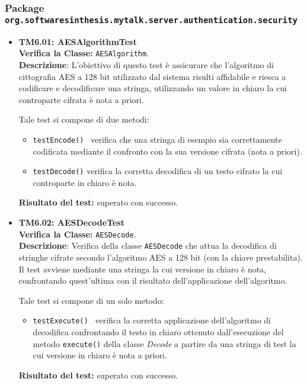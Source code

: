 \subsubsection{Package \texttt{org.softwaresinthesis.mytalk.server.authentication.security}}
\begin{itemize}

\item \textbf{TM6.01: AESAlgorithmTest}\\
\textbf{Verifica la Classe:} \texttt{AESAlgorithm}.\\
\textbf{Descrizione}: L'obiettivo di questo test è assicurare che l'algoritmo di cittografia AES a 128 bit utilizzato dal sistema \caName{} risulti affidabile e riesca a codificare e decodificare una stringa, utilizzando un valore in chiaro la cui controparte cifrata è nota a priori.

Tale test si compone di due metodi:
\begin{itemize}
\item \texttt{testEncode() } verifica che una stringa di esempio sia correttamente codificata mediante il confronto con la sua versione cifrata (nota a priori).

\item \texttt{testDecode()} verifica la corretta decodifica di un testo cifrato la cui controparte in chiaro è nota.
\end{itemize}
\textbf{Risultato del test:} superato con successo.


\item \textbf{TM6.02: AESDecodeTest}\\
\textbf{Verifica la Classe:} \texttt{AESDecode}.\\
\textbf{Descrizione}: Verifica della classe \texttt{AESDecode} che attua la decodifica di stringhe cifrate secondo l'algoritmo AES a 128 bit (con la chiave prestabilita). Il test avviene mediante una stringa la cui versione in chiaro è nota, confrontando quest'ultima con il risultato dell'applicazione dell'algoritmo.

Tale test si compone di un solo metodo:
\begin{itemize}
\item \texttt{testExecute() } verifica la corretta applicazione dell'algoritmo di decodifica confrontando il testo in chiaro ottenuto dall'esecuzione del metodo \texttt{execute()} della classe \textit{Decode} a partire da una stringa di test la cui versione in chiaro è nota a priori.
\end{itemize}
\textbf{Risultato del test:} superato con successo.



\end{itemize}
